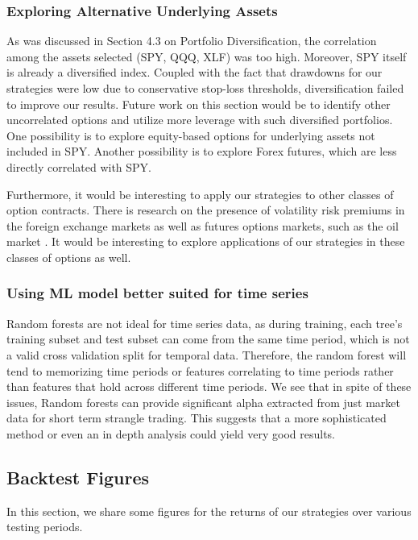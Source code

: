 \documentclass[10pt]{article}
\theoremstyle{definition}
\begin{document}
\subsubsection*{Exploring Alternative Underlying Assets}
As was discussed in Section 4.3 on Portfolio Diversification, the correlation among the assets selected (SPY, QQQ, XLF) was too high. Moreover, SPY itself is already a diversified index. Coupled with the fact that drawdowns for our strategies were low due to conservative stop-loss thresholds, diversification failed to improve our results. Future work on this section would be to identify other uncorrelated options and utilize more leverage with such diversified portfolios. One possibility is to explore equity-based options for underlying assets not included in SPY. Another possibility is to explore Forex futures, which are less directly correlated with SPY.

Furthermore, it would be interesting to apply our strategies to other classes of option contracts. There is research on the presence of volatility risk premiums in the foreign exchange markets \citep{BhatRupeeDollar, dierckx_trading_2022} as well as futures options markets, such as the oil market \citep{BouchouevOil}. It would be interesting to explore applications of our strategies in these classes of options as well.

\subsubsection*{Using ML model better suited for time series}
Random forests are not ideal for time series data, as during training, each tree's training subset and test subset can come from the same time period, which is not a valid cross validation split for temporal data. Therefore, the random forest will tend to memorizing time periods or features correlating to time periods rather than features that hold across different time periods. We see that in spite of these issues, Random forests can provide significant alpha extracted from just market data for short term strangle trading. This suggests that a more sophisticated method or even an in depth analysis could yield very good results.

\subsection*{Backtest Figures}
In this section, we share some figures for the returns of our strategies over various testing periods.
\end{document}
